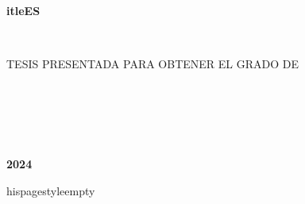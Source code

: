 \begin{center}    
  \begin{large}      
    			\textbf{itleES}      
  \end{large}  
  
  \vfill
  
  \begin{large}
    			\textbf{\student}\\[0.3cm]
  \end{large}
  
  \vfill
  
TESIS PRESENTADA PARA OBTENER EL GRADO DE\\ 
			\textbf{\degree}
  
  \vfill
  
\supervisorstitle\\
\vspace{0.5cm}

\supervisor{\supervisorone}{\universityone}

\vspace{0.5cm}
        
        \ifdefined\supervisortwo{}
   \supervisor{\supervisortwo}{\universitytwo}
        \else
        \fi
  
  \vfill
  
  			\textbf{\university\\
    \vspace{0.1cm}
    \faculty\\
    \vspace{0.1cm}
    \department}\\
  \vspace{0.5cm}
  			\textbf{2024}    
  
\end{center}
  

\emptypage %


\newpage %
    	hispagestyle{empty} %
$\ $\\ %

\vspace{3cm}

\begin{flushright} %
  			\textit{\dedication}
\end{flushright}


